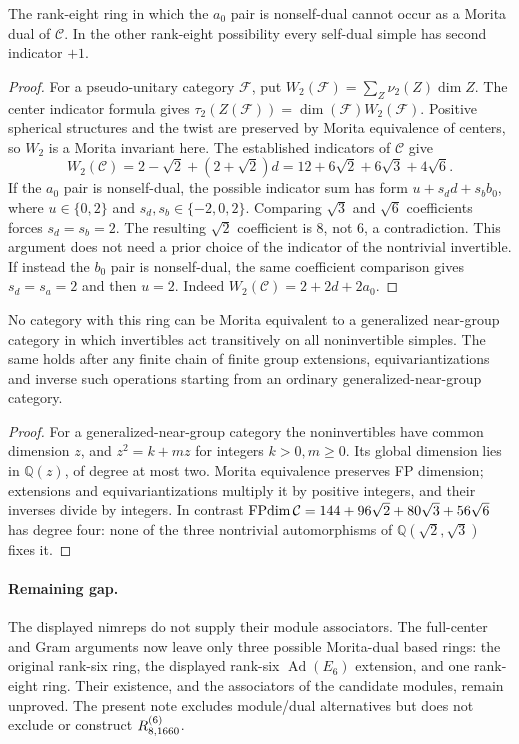 \begin{corollary}
The rank-eight ring in which the $a_0$ pair is nonself-dual cannot occur
as a Morita dual of $\mathcal C$. In the other rank-eight possibility every
self-dual simple has second indicator $+1$.
\end{corollary}
\begin{proof}
For a pseudo-unitary category $\mathcal F$, put
$W_2(\mathcal F)=\sum_Z\nu_2(Z)\dim Z$.
The center indicator formula gives
$\tau_2(Z(\mathcal F))=\dim(\mathcal F)W_2(\mathcal F)$.
Positive spherical structures and the twist are preserved by Morita
equivalence of centers, so $W_2$ is a Morita invariant here. The
established indicators of $\mathcal C$ give
\[
W_2(\mathcal C)=2-\sqrt2+(2+\sqrt2)d
       =12+6\sqrt2+6\sqrt3+4\sqrt6.
\]
If the $a_0$ pair is nonself-dual, the possible indicator sum has form
$u+s_d d+s_b b_0$, where $u\in\{0,2\}$ and
$s_d,s_b\in\{-2,0,2\}$. Comparing $\sqrt3$ and $\sqrt6$
coefficients forces $s_d=s_b=2$. The resulting $\sqrt2$ coefficient
is $8$, not $6$, a contradiction. This argument does not need a prior
choice of the indicator of the nontrivial invertible.
If instead the $b_0$ pair is nonself-dual, the same coefficient
comparison gives $s_d=s_a=2$ and then $u=2$.
Indeed $W_2(\mathcal C)=2+2d+2a_0$.
\end{proof}

\begin{corollary}
No category with this ring can be Morita equivalent to a generalized
near-group category in which invertibles act transitively on all
noninvertible simples. The same holds after any finite chain of finite
group extensions, equivariantizations and inverse such operations
starting from an ordinary generalized-near-group category.
\end{corollary}
\begin{proof}
For a generalized-near-group category the noninvertibles have common
dimension $z$, and $z^2=k+mz$ for integers $k>0,m\geq0$. Its global
dimension lies in $\mathbb Q(z)$, of degree at most two. Morita
equivalence preserves FP dimension; extensions and equivariantizations
multiply it by positive integers, and their inverses divide by integers.
In contrast $\operatorname{FPdim}\mathcal C=144+96\sqrt2+80\sqrt3+56\sqrt6$ has degree four:
none of the three nontrivial automorphisms of
$\mathbb Q(\sqrt2,\sqrt3)$ fixes it.
\end{proof}

\paragraph{Remaining gap.}
The displayed nimreps do not supply their module associators.
The full-center and Gram arguments now leave only three possible
Morita-dual based rings: the original rank-six ring, the displayed
rank-six $\operatorname{Ad}(E_6)$ extension, and one rank-eight ring.
Their existence, and the associators of the candidate modules, remain
unproved. The present note excludes module/dual alternatives but does
not exclude or construct $R^{(6)}_{8,1660}$.


